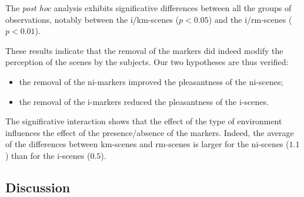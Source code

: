 \documentclass[twoside,twocolumn]{article}
\begin{document}

The \emph{post hoc} analysis exhibits significative differences between all the groups of observations, notably between the i/km-scenes ($p<0.05$) and the i/rm-scenes ($p<0.01$).


These results indicate that the removal of the markers did indeed modify the perception of the scenes by the subjects. Our two hypotheses are thus verified:


\begin{itemize}
\item the removal of the ni-markers improved the pleasantness of the ni-scenes;
\item the removal of the i-markers reduced the pleasantness of the i-scenes.
\end{itemize}


The significative interaction shows that the effect of the type of environment influences the effect of the presence/absence of the markers. Indeed, the average of the differences between km-scenes and rm-scenes is larger for the ni-scenes ($1.1$) than for the i-scenes ($0.5$).

\subsection{Discussion}

\end{document}
